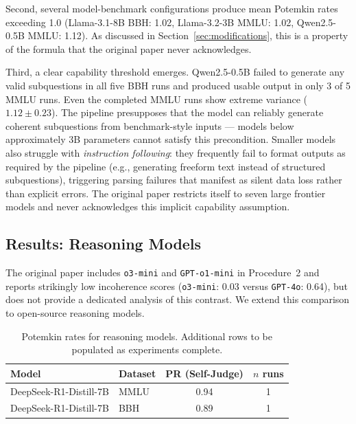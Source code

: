 \documentclass[sigconf,authordraft]{acmart}
\begin{document}
Second, several model-benchmark configurations produce mean Potemkin rates exceeding 1.0 (Llama-3.1-8B BBH: 1.02, Llama-3.2-3B MMLU: 1.02, Qwen2.5-0.5B MMLU: 1.12). As discussed in Section~\ref{sec:modifications}, this is a property of the formula that the original paper never acknowledges.

Third, a clear capability threshold emerges. Qwen2.5-0.5B failed to generate any valid subquestions in all five BBH runs and produced usable output in only 3 of 5 MMLU runs. Even the completed MMLU runs show extreme variance ($1.12 \pm 0.23$). The pipeline presupposes that the model can reliably generate coherent subquestions from benchmark-style inputs --- models below approximately 3B parameters cannot satisfy this precondition. Smaller models also struggle with \emph{instruction following}: they frequently fail to format outputs as required by the pipeline (e.g., generating freeform text instead of structured subquestions), triggering parsing failures that manifest as silent data loss rather than explicit errors. The original paper restricts itself to seven large frontier models and never acknowledges this implicit capability assumption.

\subsection{Results: Reasoning Models}
\label{sec:reasoning-models}

The original paper includes \texttt{o3-mini} and \texttt{GPT-o1-mini} in Procedure~2 and reports strikingly low incoherence scores (\texttt{o3-mini}: 0.03 versus \texttt{GPT-4o}: 0.64), but does not provide a dedicated analysis of this contrast. We extend this comparison to open-source reasoning models.

\begin{table}[t]
\centering
\small
\setlength{\tabcolsep}{4pt}
\renewcommand{\arraystretch}{1.15}
\begin{tabular}{l l c c}
\toprule
\textbf{Model} & \textbf{Dataset} & \textbf{PR (Self-Judge)} & \textbf{$n$ runs} \\
\midrule
DeepSeek-R1-Distill-7B & MMLU & 0.94 & 1 \\
DeepSeek-R1-Distill-7B & BBH  & 0.89 & 1 \\
\bottomrule
\end{tabular}
\caption{Potemkin rates for reasoning models. Additional rows to be populated as experiments complete.}
\label{tab:reasoning-models}
\end{table}
\end{document}
